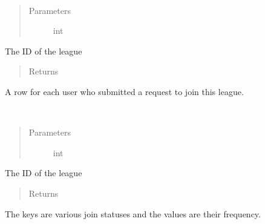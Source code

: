\documentclass[letterpaper,10pt,english]{sphinxmanual}
\begin{document}
\begin{fulllineitems}
\label{\detokenize{tiger_leagues/models/readme:tiger_leagues.models.admin_model.get_join_league_requests}}~\begin{quote}\begin{description}
\item[{Parameters}] \leavevmode
{} \textendash{} int

\end{description}\end{quote}

The ID of the league
\begin{quote}\begin{description}
\item[{Returns}] \leavevmode
{}

\end{description}\end{quote}

A row for each user who submitted a request to join this league.

\end{fulllineitems}


\begin{fulllineitems}
\label{\detokenize{tiger_leagues/models/readme:tiger_leagues.models.admin_model.get_registration_stats}}~\begin{quote}\begin{description}
\item[{Parameters}] \leavevmode
{} \textendash{} int

\end{description}\end{quote}

The ID of the league
\begin{quote}\begin{description}
\item[{Returns}] \leavevmode
{}

\end{description}\end{quote}

The keys are various join statuses and the values are their frequency.

\end{fulllineitems}
\end{document}
